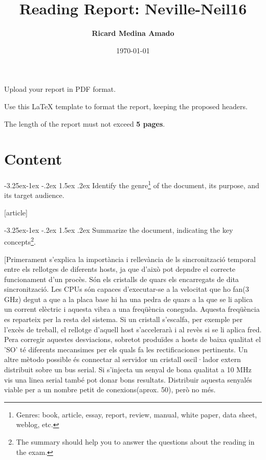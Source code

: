 \documentclass[a4paper, 10pt]{article}
\title{Reading Report:  Neville-Neil16}
\author{\textbf{Ricard Medina Amado}}
\date{\normalsize\today{}}
\makeatletter
\renewcommand\subsection{\@startsection{subsection}{2}{\z@}
	{-3.25ex\@plus -1ex \@minus -.2ex}%
	{1.5ex \@plus .2ex}%
	{\normalfont\large\itshape}}
\makeatother
\begin{document}
\maketitle

\begin{center}
  Upload your report in PDF format.
  
  Use this LaTeX template to format the report, keeping the proposed headers.
  
  The length of the report must not exceed \textbf{5 pages}.
\end{center}

\section{Content}

\subsection{Identify the genre\protect\footnote{Genres: book, article, essay, report, review, manual, white paper, data sheet, weblog, etc.} of the document, its purpose, and its target audience.}

[article]

\subsection{Summarize the document, indicating the key concepts\protect\footnote{The summary should help you to answer the questions about the reading in the exam.}.}

[Primerament s'explica la importància i rellevància de ls sincronització temporal entre els rellotges de diferents hosts, ja que d'això pot depndre el correcte funcionament d'un procès.
Són els cristalls de quars els encarregats de dita sincronització. Les CPUs són capaces d'executar-se a la velocitat que ho fan(3 GHz) degut a que a la placa base hi ha una pedra
de quars a la que se li aplica un corrent elèctric i aquesta vibra a una freqüència coneguda. Aquesta freqüència es reparteix per la resta del sistema.
Si un cristall s'escalfa, per exemple per l'excès de treball, el rellotge d'aquell host s'accelerarà i al revès si se li aplica fred.
Pera corregir aquestes desviacions, sobretot produïdes a hosts de baixa qualitat el 'SO' té diferents mecansimes per els quals fa les rectificaciones pertinents. Un altre mètodo possible és connectar al servidor un cristall
oscil·lador extern distribuit sobre un bus serial. Si s'injecta un senyal de bona qualitat a 10 MHz vis una linea serial també pot donar bons resultats. Distribuir aquesta senyalés viable per a un nombre petit de conexions(aprox. 50), però no més.
\end{document}
